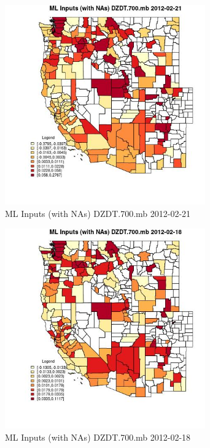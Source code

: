 \begin{figure} 
\centering  
\includegraphics[width=0.77\textwidth]{Code_Outputs/Report_ML_input_PM25_Step4_part_f_de_duplicated_aves_prioritize_24hr_obswNAs_CountyDZDT700mbMean2012-02-21.jpg} 
\caption{\label{fig:Report_ML_input_PM25_Step4_part_f_de_duplicated_aves_prioritize_24hr_obswNAsCountyDZDT700mbMean2012-02-21}ML Inputs (with NAs) DZDT.700.mb 2012-02-21} 
\end{figure} 
 

\begin{figure} 
\centering  
\includegraphics[width=0.77\textwidth]{Code_Outputs/Report_ML_input_PM25_Step4_part_f_de_duplicated_aves_prioritize_24hr_obswNAs_CountyDZDT700mbMean2012-02-18.jpg} 
\caption{\label{fig:Report_ML_input_PM25_Step4_part_f_de_duplicated_aves_prioritize_24hr_obswNAsCountyDZDT700mbMean2012-02-18}ML Inputs (with NAs) DZDT.700.mb 2012-02-18} 
\end{figure} 
 

